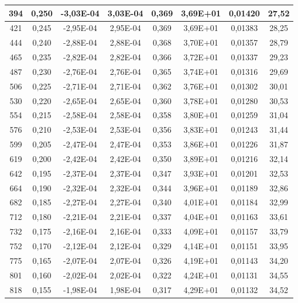 		\begin{table}[H]
			\centering
			\begin{tabular}{|c|c|c|c|c|c|c|c|}
		394 & 0,250 & -3,03E-04 & 3,03E-04 & 0,369 & 3,69E+01 & 0,01420 & 27,52 \\ \hline
		421 & 0,245 & -2,95E-04 & 2,95E-04 & 0,369 & 3,69E+01 & 0,01383 & 28,25 \\ \hline
		444 & 0,240 & -2,88E-04 & 2,88E-04 & 0,368 & 3,70E+01 & 0,01357 & 28,79 \\ \hline
		465 & 0,235 & -2,82E-04 & 2,82E-04 & 0,366 & 3,72E+01 & 0,01337 & 29,23 \\ \hline
		487 & 0,230 & -2,76E-04 & 2,76E-04 & 0,365 & 3,74E+01 & 0,01316 & 29,69 \\ \hline
		506 & 0,225 & -2,71E-04 & 2,71E-04 & 0,362 & 3,76E+01 & 0,01302 & 30,01 \\ \hline
		530 & 0,220 & -2,65E-04 & 2,65E-04 & 0,360 & 3,78E+01 & 0,01280 & 30,53 \\ \hline
		554 & 0,215 & -2,58E-04 & 2,58E-04 & 0,358 & 3,80E+01 & 0,01259 & 31,04 \\ \hline
		576 & 0,210 & -2,53E-04 & 2,53E-04 & 0,356 & 3,83E+01 & 0,01243 & 31,44 \\ \hline
		599 & 0,205 & -2,47E-04 & 2,47E-04 & 0,353 & 3,86E+01 & 0,01226 & 31,87 \\ \hline
		619 & 0,200 & -2,42E-04 & 2,42E-04 & 0,350 & 3,89E+01 & 0,01216 & 32,14 \\ \hline
		642 & 0,195 & -2,37E-04 & 2,37E-04 & 0,347 & 3,93E+01 & 0,01201 & 32,53 \\ \hline
		664 & 0,190 & -2,32E-04 & 2,32E-04 & 0,344 & 3,96E+01 & 0,01189 & 32,86 \\ \hline
		682 & 0,185 & -2,27E-04 & 2,27E-04 & 0,340 & 4,01E+01 & 0,01184 & 32,99 \\ \hline
		712 & 0,180 & -2,21E-04 & 2,21E-04 & 0,337 & 4,04E+01 & 0,01163 & 33,61 \\ \hline
		732 & 0,175 & -2,16E-04 & 2,16E-04 & 0,333 & 4,09E+01 & 0,01157 & 33,79 \\ \hline
		752 & 0,170 & -2,12E-04 & 2,12E-04 & 0,329 & 4,14E+01 & 0,01151 & 33,95 \\ \hline
		775 & 0,165 & -2,07E-04 & 2,07E-04 & 0,326 & 4,19E+01 & 0,01143 & 34,20 \\ \hline
		801 & 0,160 & -2,02E-04 & 2,02E-04 & 0,322 & 4,24E+01 & 0,01131 & 34,55 \\ \hline
		818 & 0,155 & -1,98E-04 & 1,98E-04 & 0,317 & 4,29E+01 & 0,01132 & 34,52 \\ \hline

\end{tabular}
\end{table}
